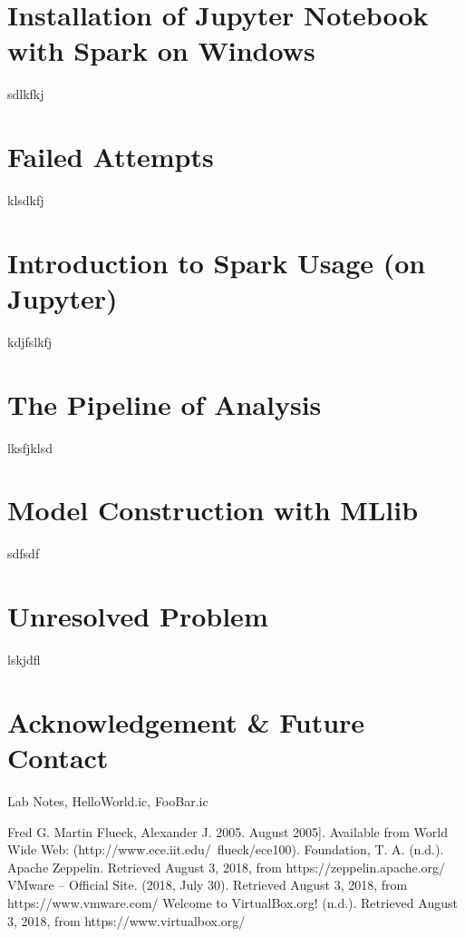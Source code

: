 \documentclass[a4paper, 12pt]{article}
\begin{document}
    \section*{Installation of Jupyter Notebook with Spark on Windows}
    sdlkfkj
    
    \section*{Failed Attempts}
    klsdkfj
    
    \section*{Introduction to Spark Usage (on Jupyter)}
    kdjfslkfj
    
    \section*{The Pipeline of Analysis}
    lksfjklsd
    
    \section*{Model Construction with MLlib}
    sdfsdf
    
    \section*{Unresolved Problem}
    lskjdfl
    
    \section*{Acknowledgement \& Future Contact}
    Lab Notes, HelloWorld.ic, FooBar.ic
    
    \begin{thebibliography}{9}
     Fred G. Martin 
      Flueck, Alexander J. 2005.
    August 2005]. Available from World Wide Web: (http://www.ece.iit.edu/~flueck/ece100).
     Foundation, T. A. (n.d.). Apache Zeppelin. Retrieved August 3, 2018, from https://zeppelin.apache.org/
     VMware – Official Site. (2018, July 30). Retrieved August 3, 2018, from https://www.vmware.com/
     Welcome to VirtualBox.org! (n.d.). Retrieved August 3, 2018, from https://www.virtualbox.org/
    \end{thebibliography}
    
    
\end{document}
